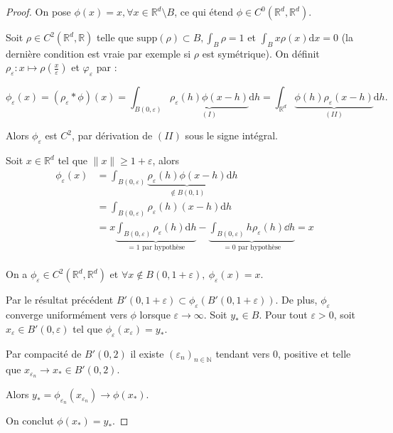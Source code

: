 \begin{proof}
On pose $\phi\left( x \right) =x, \forall x \in \mathbb{R}^d \setminus B$, ce qui étend $\phi \in C^0 \left( \mathbb{R}^d, \mathbb{R}^d  \right) $.

Soit $\rho \in C^2\left( \mathbb{R}^d, \mathbb{R} \right) $ telle que $\text{supp} (\rho)\subset B, \int_{B} \rho =1$ et $\int_B x\rho\left( x \right) \mathrm{d} x=0$ (la dernière condition est vraie par exemple si $\rho$ est symétrique). On définit $\rho_\varepsilon : x \mapsto \rho(\frac{x}{\varepsilon})$ et $\varphi_\varepsilon$ par :

$$ \phi_\varepsilon\left( x \right) = \left( \rho_\varepsilon * \phi \right)\left( x \right) = \int_{B\left( 0, \varepsilon \right) } \underbrace{\rho_\varepsilon\left( h \right)  \phi\left( x-h \right)}_{(I)} \mathrm{d} h = \int_{\mathbb{R}^d } \underbrace{\phi\left( h \right) \rho_\varepsilon\left( x-h \right)}_{\left( II \right) } \mathrm{d} h.$$

Alors $\phi_{\varepsilon}$ est $C^2$, par dérivation de $\left( II \right) $ sous le signe intégral.

Soit $x \in  \mathbb{R}^d $ tel que $\|x\|\ge 1 +\varepsilon$, alors 
\begin{align*}
	\phi_{\varepsilon}\left( x \right) &= \int_{B\left( 0, \varepsilon \right) } \underbrace{\rho_{\varepsilon} \left( h \right) \phi\left( x-h \right)}_{ \not\in B\left( 0,1 \right) } \mathrm{d} h\\
	&= \int_{B\left( 0, \varepsilon \right) } \rho_{\varepsilon}\left( h \right) \left( x-h \right) \mathrm{d} h \\
	&= x \underbrace{\int_{B\left( 0, \varepsilon \right) } \rho_{\varepsilon}\left( h \right) \mathrm{d} h}_{ = 1 \text{ par hypothèse}} - 
 \underbrace{\int_{B\left( 0, \varepsilon \right) } h\rho_{\varepsilon}\left( h \right) \dd h }_{= 0 \text{ par hypothèse}}=x \\
\end{align*} 

On a $ \phi_{\varepsilon} \in C^2\left( \mathbb{R}^d , \mathbb{R}^d  \right) $ et $\forall x \not\in B\left( 0, 1 + \varepsilon \right), ~ \phi_{\varepsilon}\left( x \right) = x$.

Par le résultat précédent $B'\left( 0, 1+ \varepsilon \right) \subset  \phi_{\varepsilon}\left( B'\left( 0, 1 + \varepsilon \right)  \right) $. De plus, $\phi_{\varepsilon}$ converge uniformément vers $\phi$ lorsque $ \varepsilon \to \infty$. Soit $y_* \in B.$ Pour tout $\varepsilon>0$, soit  $x_{\varepsilon} \in B'\left( 0, \varepsilon \right) $ tel que $ \phi_{\varepsilon}\left( x_{\varepsilon} \right) = y_{*}$.

Par compacité de $B'\left( 0,2 \right) $ il existe $\left( \varepsilon_{n} \right) _{n\in \mathbb{N}}$ tendant vers 0, positive et telle que $x_{\varepsilon_n} \to x_* \in B'\left(0,2  \right) $.

Alors $ y_* = \phi_{\varepsilon_n}\left( x_{\varepsilon_n} \right) \to \phi\left( x_* \right) $.

On conclut $ \phi\left( x_* \right) = y_*$.
\end{proof}


